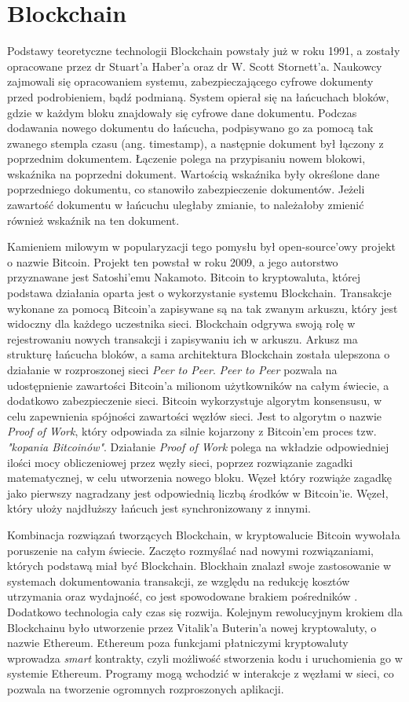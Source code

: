 \documentclass[a4paper,12pt]{book}
\begin{document}
\chapter{Blockchain}
Podstawy teoretyczne technologii Blockchain powstały już w roku 1991, a zostały opracowane przez dr Stuart'a Haber'a oraz dr W. Scott Stornett'a. Naukowcy zajmowali się opracowaniem systemu, zabezpieczającego cyfrowe dokumenty przed podrobieniem, bądź podmianą. System opierał się na łańcuchach bloków, gdzie w każdym bloku znajdowały się cyfrowe dane dokumentu. Podczas dodawania nowego dokumentu do łańcucha, podpisywano go za pomocą tak zwanego stempla czasu (ang. timestamp), a następnie dokument był łączony z poprzednim dokumentem. Łączenie polega na przypisaniu nowem blokowi, wskaźnika na poprzedni dokument. Wartością wskaźnika były określone dane poprzedniego dokumentu, co stanowiło zabezpieczenie dokumentów. Jeżeli zawartość dokumentu w łańcuchu uległaby zmianie, to należałoby zmienić również wskaźnik na ten dokument\cite{pa}.

Kamieniem milowym w popularyzacji tego pomysłu był open-source'owy projekt o nazwie Bitcoin. Projekt ten powstał w roku 2009, a jego autorstwo przyznawane jest Satoshi'emu Nakamoto. Bitcoin to kryptowaluta, której podstawa działania oparta jest o wykorzystanie systemu Blockchain. Transakcje wykonane za pomocą Bitcoin'a zapisywane są na tak zwanym arkuszu, który jest widoczny dla każdego uczestnika sieci. Blockchain odgrywa swoją rolę w rejestrowaniu nowych transakcji i zapisywaniu ich w arkuszu. Arkusz ma strukturę łańcucha bloków, a sama architektura Blockchain została ulepszona o działanie w rozproszonej sieci \textit{Peer to Peer}. \textit{Peer to Peer} pozwala na udostępnienie zawartości Bitcoin'a milionom użytkowników na całym świecie, a dodatkowo zabezpieczenie sieci. Bitcoin wykorzystuje algorytm konsensusu, w celu zapewnienia spójności zawartości węzłów sieci. Jest to algorytm o nazwie \textit{Proof of Work}, który odpowiada za silnie kojarzony z Bitcoin'em proces tzw. \textit{"kopania Bitcoinów"}.
Działanie \textit{Proof of Work} polega na wkładzie odpowiedniej ilości mocy obliczeniowej przez węzły sieci, poprzez rozwiązanie zagadki matematycznej, w celu utworzenia nowego bloku. Węzeł który rozwiąże zagadkę jako pierwszy nagradzany jest odpowiednią liczbą środków w Bitcoin'ie. Węzeł, który ułoży najdłuższy łańcuch jest synchronizowany z innymi\cite{bitcoin}.

Kombinacja rozwiązań tworzących Blockchain, w kryptowalucie Bitcoin wywołała poruszenie na całym świecie. Zaczęto rozmyślać nad nowymi rozwiązaniami, których podstawą miał być Blockchain. Blockhain znalazł swoje zastosowanie w systemach dokumentowania transakcji, ze względu na redukcję kosztów utrzymania oraz wydajność, co jest spowodowane brakiem pośredników \cite{business}. Dodatkowo technologia cały czas się rozwija. Kolejnym rewolucyjnym krokiem dla Blockchainu było utworzenie przez Vitalik'a Buterin'a nowej kryptowaluty, o nazwie Ethereum. Ethereum poza funkcjami płatniczymi kryptowaluty wprowadza \textit{smart} kontrakty, czyli możliwość stworzenia kodu i uruchomienia go w systemie Ethereum. Programy mogą wchodzić w interakcje z węzłami w sieci, co pozwala na tworzenie ogromnych rozproszonych aplikacji.
\end{document}
